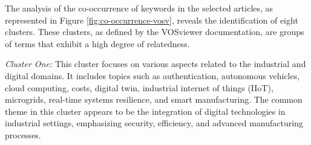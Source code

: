 The analysis of the co-occurrence of keywords in the selected articles, as represented in Figure \ref{fig:co-occurrence-vosv}, reveals the identification of eight clusters. These clusters, as defined by the VOSviewer documentation, are groups of terms that exhibit a high degree of relatedness. 






\textit{Cluster One:}
This cluster focuses on various aspects related to the industrial and digital domains. It includes topics such as authentication, autonomous vehicles, cloud computing, costs, digital twin, industrial internet of things (IIoT), microgrids, real-time systems resilience, and smart manufacturing. The common theme in this cluster appears to be the integration of digital technologies in industrial settings, emphasizing security, efficiency, and advanced manufacturing processes.

